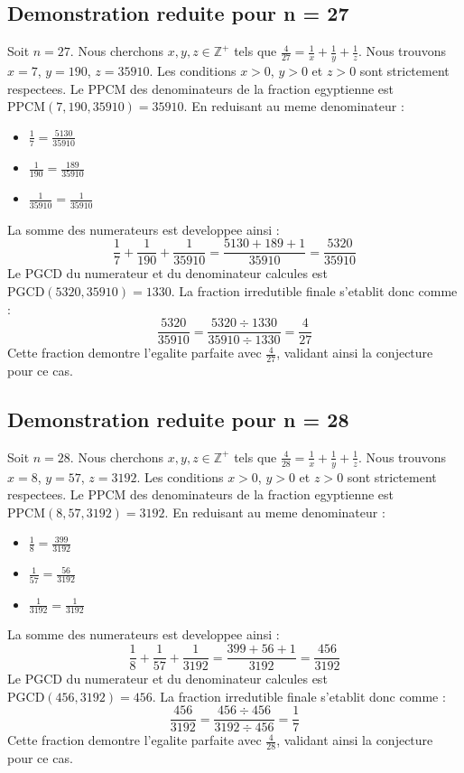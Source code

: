 \documentclass[11pt,a4paper]{article}
\begin{document}
\subsection{Demonstration reduite pour n = 27}
Soit $n = 27$. Nous cherchons $x, y, z \in \mathbb{Z}^{+}$ tels que $\frac{4}{27} = \frac{1}{x} + \frac{1}{y} + \frac{1}{z}$.
Nous trouvons $x = 7$, $y = 190$, $z = 35910$.
Les conditions $x > 0$, $y > 0$ et $z > 0$ sont strictement respectees.
Le PPCM des denominateurs de la fraction egyptienne est $\text{PPCM}(7, 190, 35910) = 35910$.
En reduisant au meme denominateur :
\begin{itemize}
    \item $\frac{1}{7} = \frac{5130}{35910}$
    \item $\frac{1}{190} = \frac{189}{35910}$
    \item $\frac{1}{35910} = \frac{1}{35910}$
\end{itemize}
La somme des numerateurs est developpee ainsi :
$$ \frac{1}{7} + \frac{1}{190} + \frac{1}{35910} = \frac{5130 + 189 + 1}{35910} = \frac{5320}{35910} $$
Le PGCD du numerateur et du denominateur calcules est $\text{PGCD}(5320, 35910) = 1330$.
La fraction irredutible finale s'etablit donc comme :
$$ \frac{5320}{35910} = \frac{5320 \div 1330}{35910 \div 1330} = \frac{4}{27} $$
Cette fraction demontre l'egalite parfaite avec $\frac{4}{27}$, validant ainsi la conjecture pour ce cas.

\subsection{Demonstration reduite pour n = 28}
Soit $n = 28$. Nous cherchons $x, y, z \in \mathbb{Z}^{+}$ tels que $\frac{4}{28} = \frac{1}{x} + \frac{1}{y} + \frac{1}{z}$.
Nous trouvons $x = 8$, $y = 57$, $z = 3192$.
Les conditions $x > 0$, $y > 0$ et $z > 0$ sont strictement respectees.
Le PPCM des denominateurs de la fraction egyptienne est $\text{PPCM}(8, 57, 3192) = 3192$.
En reduisant au meme denominateur :
\begin{itemize}
    \item $\frac{1}{8} = \frac{399}{3192}$
    \item $\frac{1}{57} = \frac{56}{3192}$
    \item $\frac{1}{3192} = \frac{1}{3192}$
\end{itemize}
La somme des numerateurs est developpee ainsi :
$$ \frac{1}{8} + \frac{1}{57} + \frac{1}{3192} = \frac{399 + 56 + 1}{3192} = \frac{456}{3192} $$
Le PGCD du numerateur et du denominateur calcules est $\text{PGCD}(456, 3192) = 456$.
La fraction irredutible finale s'etablit donc comme :
$$ \frac{456}{3192} = \frac{456 \div 456}{3192 \div 456} = \frac{1}{7} $$
Cette fraction demontre l'egalite parfaite avec $\frac{4}{28}$, validant ainsi la conjecture pour ce cas.
\end{document}
